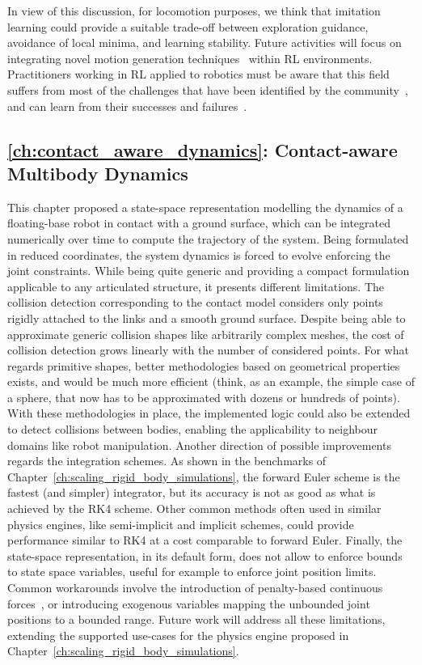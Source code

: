 In view of this discussion, for locomotion purposes, we think that imitation learning could provide a suitable trade-off between exploration guidance, avoidance of local minima, and learning stability.
Future activities will focus on integrating novel motion generation techniques~\parencite{viceconte_adherent_2022} within \ac{RL} environments.
Practitioners working in \ac{RL} applied to robotics must be aware that this field suffers from most of the challenges that have been identified by the community~\parencite{dulac-arnold_empirical_2021}, and can learn from their successes and failures~\parencite{ibarz_how_2021}.

\subsection*{\autoref{ch:contact_aware_dynamics}: Contact-aware Multibody Dynamics}

This chapter proposed a state-space representation modelling the dynamics of a floating-base robot in contact with a ground surface, which can be integrated numerically over time to compute the trajectory of the system.
Being formulated in reduced coordinates, the system dynamics is forced to evolve enforcing the joint constraints.
While being quite generic and providing a compact formulation applicable to any articulated structure, it presents different limitations.
The collision detection corresponding to the contact model considers only points rigidly attached to the links and a smooth ground surface.
Despite being able to approximate generic collision shapes like arbitrarily complex meshes, the cost of collision detection grows linearly with the number of considered points.
For what regards primitive shapes, better methodologies based on geometrical properties exists, and would be much more efficient (think, as an example, the simple case of a sphere, that now has to be approximated with dozens or hundreds of points).
With these methodologies in place, the implemented logic could also be extended to detect collisions between bodies, enabling the applicability to neighbour domains like robot manipulation.
Another direction of possible improvements regards the integration schemes.
As shown in the benchmarks of Chapter~\ref{ch:scaling_rigid_body_simulations}, the forward Euler scheme is the fastest (and simpler) integrator, but its accuracy is not as good as what  is achieved by the \ac{RK4} scheme.
Other common methods often used in similar physics engines, like semi-implicit and implicit schemes, could provide performance similar to \ac{RK4} at a cost comparable to forward Euler.
Finally, the state-space representation, in its default form, does not allow to enforce bounds to state space variables, useful for example to enforce joint position limits.
Common workarounds involve the introduction of penalty-based continuous forces~\parencite{xu_accelerated_2022}, or introducing exogenous variables mapping the unbounded joint positions to a bounded range.
Future work will address all these limitations, extending the supported use-cases for the physics engine proposed in Chapter~\ref{ch:scaling_rigid_body_simulations}.

